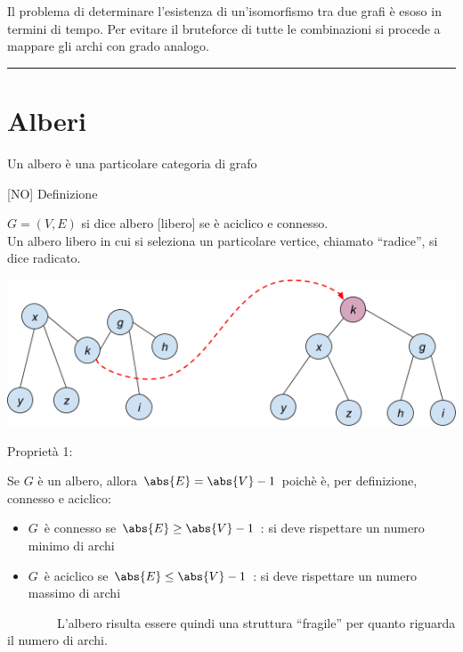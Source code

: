 \documentclass{article}
\providecommand{\tightlist}{%
  \setlength{\itemsep}{0pt}\setlength{\parskip}{0pt}}
\begin{document}
{}

{Il problema di determinare l'esistenza di un'isomorfismo tra due grafi
è esoso in termini di tempo. Per evitare il bruteforce di tutte le
combinazioni si procede a mappare gli archi con grado analogo.}

\begin{center}\rule{0.5\linewidth}{\linethickness}\end{center}

\hypertarget{h.jnoiha3cadu8}{\section{\texorpdfstring{{Alberi}}{Alberi}}\label{h.jnoiha3cadu8}}

{Un albero è una particolare categoria di grafo}

{}

{}

{{[}NO{]} Definizione}

$G=(V,E)$ si dice albero {[}libero{]} se è aciclico e connesso.\\
Un albero libero in cui si seleziona un particolare vertice, chiamato ``radice'', si dice radicato.

{\includegraphics{images/image533.png}}

{}

{}

{}

{Proprietà 1:}

Se $G$ è un albero,
allora $\abs{E} = \abs{V} - 1$ poichè è, per definizione, connesso e aciclico:

\begin{itemize}
\tightlist
\item
  $G${~è connesso se $\abs{E} \geq \abs{V} - 1$ : si deve rispettare un numero minimo di archi}
\item
  $G${~è aciclico se $\abs{E} \leq \abs{V} - 1$ : si deve rispettare un numero massimo di archi}
\end{itemize}

{~~~~~~~~L'albero risulta essere quindi una struttura ``fragile'' per
quanto riguarda il numero di archi.}
\end{document}
